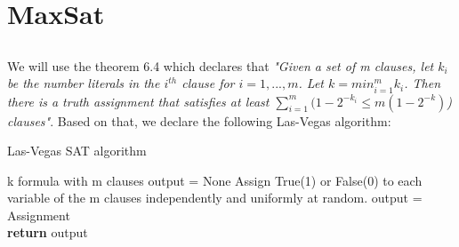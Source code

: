 \documentclass[11pt]{537homework}
\author{Emmanouil Kritharakis}
\begin{document}
\section{MaxSat}
\subsection{}
We will use the theorem 6.4 which declares that \textit{"Given a set of m clauses, let $k_i$ be the number literals in the $i^{th}$ clause for $i=1,...,m$. Let $k = min_{i=1}^{m} k_i$.  Then there is a truth assignment that satisfies at least $ \sum_{i=1}^{m} (1-2^{-k_i} \leq m(1-2^{-k})$) clauses"}. Based on that, we declare the following Las-Vegas algorithm:
\begin{algorithm}
\caption{Las-Vegas SAT  algorithm}
\begin{algorithmic}
    \Require k formula with m clauses
    \State output = None 
      \State Assign True(1) or False(0) to each variable of the m clauses independently and uniformly at random.
          \State output = Assignment
      \EndIf 
\EndWhile \\
\textbf{return} output 
\end{algorithmic}
\end{algorithm}
\end{document}

